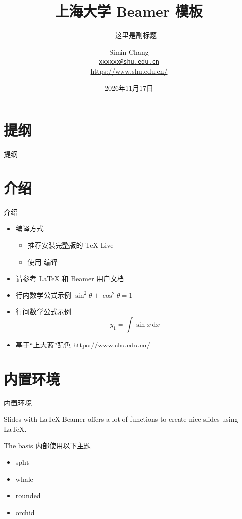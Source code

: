 \documentclass[10pt,aspectratio=169,usepdftitle=false]{beamer}
\title[上海大学 Beamer 模板]{上海大学 Beamer 模板}
\subtitle{——这里是副标题}
\author[Simin Chang]{%
  Simin Chang\\[0.4em]
  {\small\href{mailto:xxxxxx@shu.edu.cn}{\nolinkurl{xxxxxx@shu.edu.cn}}}\\
  {\small\url{https://www.shu.edu.cn/}}}
\institute[上海大学]{计算机工程与科学学院\\上海大学}
\date[2026年11月17日]{2026年11月17日}
\begin{document}
\begin{frame}
  \titlepage
\end{frame}

\section{提纲}
\begin{frame}{提纲}
  \tableofcontents
\end{frame}

\section{介绍}
\begin{frame}{介绍}
  \begin{itemize}
    \item 编译方式
      \begin{itemize}
        \item 推荐安装完整版的 TeX Live
        \item 使用 \XeLaTeX{} 编译
      \end{itemize}
    \item 请参考 \LaTeX{} 和 Beamer 用户文档
    \item 行内数学公式示例 $\sin^2\theta+\cos^2\theta=1$
    \item 行间数学公式示例
      \begin{equation}
        y_1=\int\sin x\,\mathrm{d}x
      \end{equation}
    \item 基于“上大蓝”配色 \url{https://www.shu.edu.cn/}
  \end{itemize}
\end{frame}

\section{内置环境}
\begin{frame}{内置环境}
  \begin{block}{Slides with \LaTeX}
    Beamer offers a lot of functions to create nice slides using \LaTeX.
  \end{block}
  \begin{block}{The basis}
    内部使用以下主题
    \begin{itemize}
      \item split
      \item whale
      \item rounded
      \item orchid
    \end{itemize}
  \end{block}
\end{frame}
\end{document}
